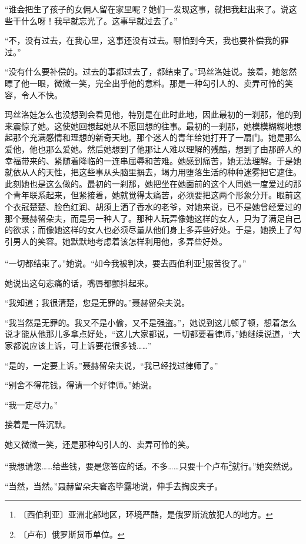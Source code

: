 \documentclass[12pt,UTF-8,openany]{ctexbook}
\begin{document}
\begin{normalsize}
    “谁会把生了孩子的女佣人留在家里呢？她们一发现这事，就把我赶出来了。说这些干什么呀！我早就忘光了。这事早就过去了。”
    
    “不，没有过去，在我心里，这事还没有过去。哪怕到今天，我也要补偿我的罪过。”
    
    “没有什么要补偿的。过去的事都过去了，都结束了。”玛丝洛娃说。接着，她忽然瞟了他一眼，微微一笑，完全出乎他的意料。那是一种勾引人的、卖弄可怜的笑容，令人不快。
    
    玛丝洛娃怎么也没想到会看见他，特别是在此时此地，因此最初的一刹那，他的到来震惊了她。这使她回想起她从不愿回想的往事。最初的一刹那，她模模糊糊地想起那个充满感情和理想的新奇天地。那个迷人的青年给她打开了一扇门。她是那么爱他，他也那么爱她。然后她想到了他那让人难以理解的残酷，想到了由那醉人的幸福带来的、紧随着降临的一连串屈辱和苦难。她感到痛苦，她无法理解。于是她就依从人的天性，把这些事从头脑里摒去，竭力用堕落生活的种种迷雾把它遮住。此刻她也是这么做的。最初的一刹那，她把坐在她面前的这个人同她一度爱过的那个青年联系起来，但紧接着，她就觉得太痛苦，必须要把这两个形象分开。眼前这个衣冠楚楚、脸色红润、胡须上洒了香水的老爷，对她来说，已不是她曾经爱过的那个聂赫留朵夫，而是另一种人了。那种人玩弄像她这样的女人，只为了满足自己的欲求；而像她这样的女人也必须尽量从他们身上多弄些好处。于是，她换上了勾引男人的笑容。她默默地考虑着该怎样利用他，多弄些好处。
    
    “一切都结束了。”她说。“如今我被判决，要去西伯利亚\footnote{〔西伯利亚〕亚洲北部地区，环境严酷，是俄罗斯流放犯人的地方。}服苦役了。”
    
    她说出这句悲痛的话，嘴唇都颤抖起来。
    
    “我知道；我很清楚，您是无罪的。”聂赫留朵夫说。
    
    “我当然是无罪的。我又不是小偷，又不是强盗。”，她说到这儿顿了顿，想着怎么说才能从他那儿多拿点好处，“这儿大家都说，一切都要看律师，”她继续说道，“大家都说应该上诉，可上诉要花很多钱……”
    
    “是的，一定要上诉。”聂赫留朵夫说，“我已经找过律师了。”
    
    “别舍不得花钱，得请一个好律师。”她说。
    
    “我一定尽力。”
    
    接着是一阵沉默。
    
    她又微微一笑，还是那种勾引人的、卖弄可怜的笑。
    
    “我想请您……给些钱，要是您答应的话。不多……只要十个卢布\footnote{〔卢布〕俄罗斯货币单位。}就行。”她突然说。
    
    “当然，当然。”聂赫留朵夫窘态毕露地说，伸手去掏皮夹子。
    

\end{normalsize}
\end{document}
